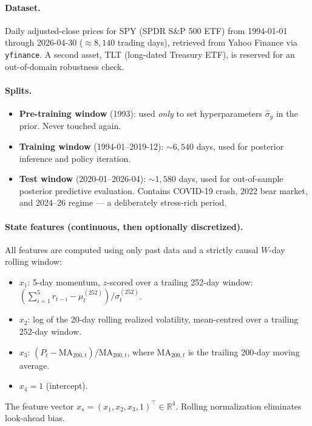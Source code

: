 \documentclass[11pt]{article}
\newcommand{\R}{\mathbb{R}}
\begin{document}
\paragraph{Dataset.} Daily adjusted-close prices for SPY (SPDR S\&P 500 ETF) from 1994-01-01 through 2026-04-30 ($\approx 8{,}140$ trading days), retrieved from Yahoo Finance via \texttt{yfinance}. A second asset, TLT (long-dated Treasury ETF), is reserved for an out-of-domain robustness check.

\paragraph{Splits.}
\begin{itemize}[leftmargin=*]
\item \textbf{Pre-training window} (1993): used \emph{only} to set hyperparameters $\hat\sigma_y$ in the prior. Never touched again.
\item \textbf{Training window} (1994-01--2019-12): $\sim 6{,}540$ days, used for posterior inference and policy iteration.
\item \textbf{Test window} (2020-01--2026-04): $\sim 1{,}580$ days, used for out-of-sample posterior predictive evaluation. Contains COVID-19 crash, 2022 bear market, and 2024--26 regime --- a deliberately stress-rich period.
\end{itemize}

\paragraph{State features (continuous, then optionally discretized).} All features are computed using only past data and a strictly causal $W$-day rolling window:
\begin{itemize}[leftmargin=*]
\item $x_1$: 5-day momentum, $z$-scored over a trailing 252-day window: $(\sum_{i=1}^5 r_{t-i} - \mu_t^{(252)}) / \sigma_t^{(252)}$.
\item $x_2$: log of the 20-day rolling realized volatility, mean-centred over a trailing 252-day window.
\item $x_3$: $(P_t - \mathrm{MA}_{200,t})/\mathrm{MA}_{200,t}$, where $\mathrm{MA}_{200,t}$ is the trailing 200-day moving average.
\item $x_4 = 1$ (intercept).
\end{itemize}
The feature vector $x_s = (x_1, x_2, x_3, 1)^\top \in \R^4$. Rolling normalization eliminates look-ahead bias.
\end{document}
